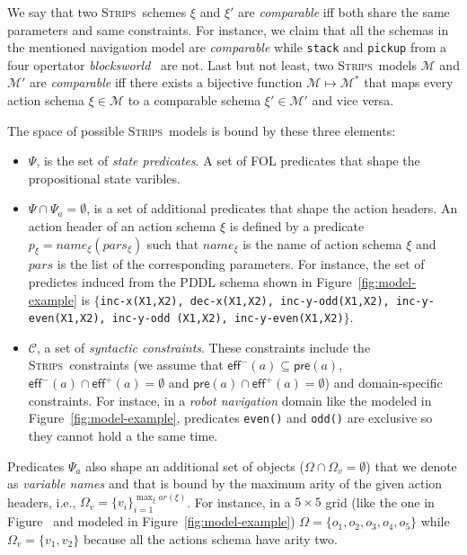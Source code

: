 \documentclass[letterpaper]{article} %
\newcommand{\pre}{\mathsf{pre}}     %
\newcommand{\eff}{\mathsf{eff}}     %
\newcommand{\strips}{\textsc{Strips}}     %
\begin{document}
We say that two \strips\ schemes $\xi$ and $\xi'$ are {\em comparable} iff both share the same parameters and same constraints. For instance, we claim that all the schemas in the mentioned navigation model are {\em comparable} while {\small\tt stack} and {\small\tt pickup} from a four opertator {\em blocksworld}~\cite{slaney2001blocks} are not. Last but not least, two \strips\ models $\mathcal{M}$ and $\mathcal{M}'$ are {\em comparable} iff there exists a bijective function $\mathcal{M} \mapsto \mathcal{M}^*$ that maps every action schema $\xi\in\mathcal{M}$ to a comparable schema $\xi'\in\mathcal{M'}$ and vice versa.


The space of possible \strips\ models is bound by these three elements:
\begin{itemize}
\item $\Psi$, is the set of {\em state predicates}. A set of FOL predicates  that shape the propositional state varibles.
\item $\Psi\cap\Psi_a =\emptyset$, is a set of additional predicates that shape the action headers. An action header of an action schema $\xi$ is defined by a predicate $p_\xi=name_\xi(pars_\xi)$ such that $name_\xi$ is the name of action schema $\xi$ and $pars$ is the list of the corresponding parameters. For instance, the set of predictes induced from the PDDL schema shown in Figure~\ref{fig:model-example} is $\{${\small\tt inc-x(X1,X2), dec-x(X1,X2), inc-y-odd(X1,X2), inc-y-even(X1,X2), inc-y-odd (X1,X2), inc-y-even(X1,X2)}$\}$. 
\item ${\mathcal C}$, a set of {\em syntactic constraints}. These constraints include the \strips\ constraints (we assume that $\eff^-(a)\subseteq \pre(a)$, $\eff^-(a)\cap \eff^+(a)=\emptyset$ and $\pre(a)\cap \eff^+(a)=\emptyset$) and domain-specific constraints. For instace, in a {\em robot navigation} domain like the modeled in Figure~\ref{fig:model-example}, predicates {\small\tt even()} and {\small\tt odd()} are exclusive so they cannot hold a the same time.
\end{itemize}



Predicates $\Psi_a$ also shape an additional set of objects ($\Omega\cap\Omega_v=\emptyset$) that we denote as {\em variable names} and that is bound by the maximum arity of the given action headers, i.e., $\Omega_v=\{v_i\}_{i=1}^{\operatorname*{max}_{\xi} ar(\xi)}$. For instance, in a $5\times 5$ grid (like the one in Figure~\label{fig:grid-example} and modeled in Figure~\ref{fig:model-example}) $\Omega=\{o_1, o_2, o_3, o_4, o_5\}$ while $\Omega_v=\{v_1, v_2\}$ because all the actions schema have arity two.
\end{document}

